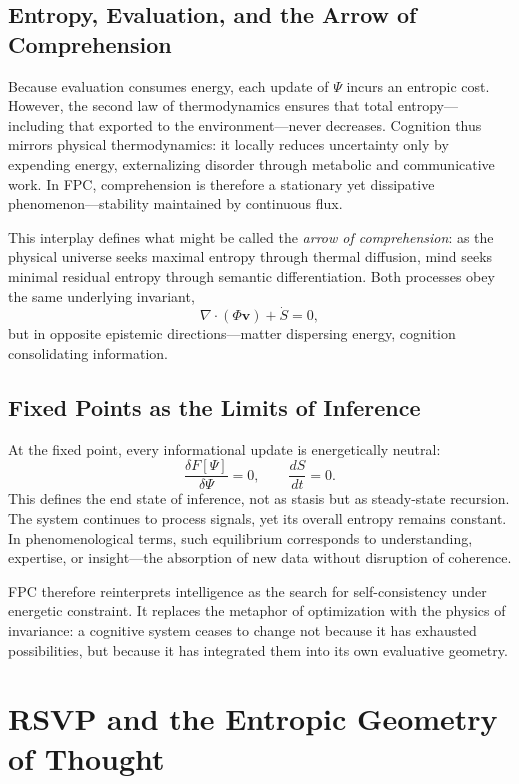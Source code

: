 \documentclass[12pt,a4paper]{article}
\begin{document}
\subsection{Entropy, Evaluation, and the Arrow of Comprehension}

Because evaluation consumes energy, each update of $\Psi$ incurs an entropic cost.
However, the second law of thermodynamics ensures that total entropy—including that exported to the environment—never decreases.
Cognition thus mirrors physical thermodynamics: it locally reduces uncertainty only by expending energy, externalizing disorder through metabolic and communicative work.
In FPC, comprehension is therefore a stationary yet dissipative phenomenon—stability maintained by continuous flux.

This interplay defines what might be called the \emph{arrow of comprehension}:
as the physical universe seeks maximal entropy through thermal diffusion,
mind seeks minimal residual entropy through semantic differentiation.
Both processes obey the same underlying invariant,
\[
\nabla\!\cdot(\Phi\mathbf{v})+\dot{S}=0,
\]
but in opposite epistemic directions—matter dispersing energy, cognition consolidating information.

\subsection{Fixed Points as the Limits of Inference}

At the fixed point, every informational update is energetically neutral:
\[
\frac{\delta F[\Psi]}{\delta \Psi}=0,
\qquad
\frac{dS}{dt}=0.
\]
This defines the end state of inference, not as stasis but as steady-state recursion.
The system continues to process signals, yet its overall entropy remains constant.
In phenomenological terms, such equilibrium corresponds to understanding, expertise, or insight—the absorption of new data without disruption of coherence.

FPC therefore reinterprets intelligence as the search for self-consistency under energetic constraint.
It replaces the metaphor of optimization with the physics of invariance: a cognitive system ceases to change not because it has exhausted possibilities, but because it has integrated them into its own evaluative geometry.

\section{RSVP and the Entropic Geometry of Thought}
\end{document}

